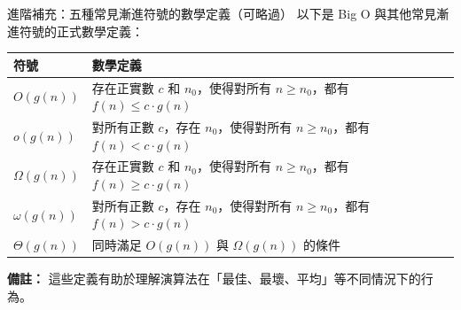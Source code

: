 \documentclass{beamer}
\begin{document}
\begin{frame}{進階補充：五種常見漸進符號的數學定義（可略過）}
以下是 Big O 與其他常見漸進符號的正式數學定義：

\vspace{0.1em}
\begin{center}
\renewcommand{\arraystretch}{1.5}
\begin{tabular}{|l|p{9cm}|}
\hline
\textbf{符號} & \textbf{數學定義} \\
\hline
$O(g(n))$ & 存在正實數 $c$ 和 $n_0$，使得對所有 $n \ge n_0$，都有 $f(n) \le c \cdot g(n)$ \\
\hline
$o(g(n))$ & 對所有正數 $c$，存在 $n_0$，使得對所有 $n \ge n_0$，都有 $f(n) < c \cdot g(n)$ \\
\hline
$\Omega(g(n))$ & 存在正實數 $c$ 和 $n_0$，使得對所有 $n \ge n_0$，都有 $f(n) \ge c \cdot g(n)$ \\
\hline
$\omega(g(n))$ & 對所有正數 $c$，存在 $n_0$，使得對所有 $n \ge n_0$，都有 $f(n) > c \cdot g(n)$ \\
\hline
$\Theta(g(n))$ & 同時滿足 $O(g(n))$ 與 $\Omega(g(n))$ 的條件 \\
\hline
\end{tabular}
\end{center}

\vspace{0.1em}
\textbf{備註：} 這些定義有助於理解演算法在「最佳、最壞、平均」等不同情況下的行為。
\end{frame}
\end{document}
